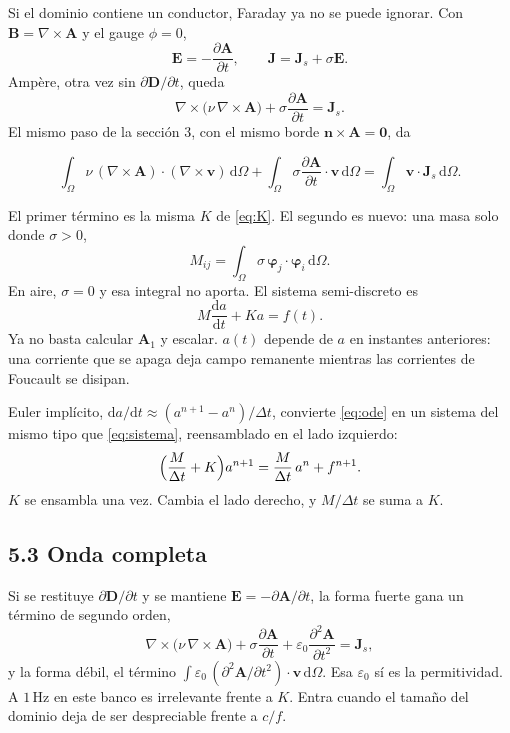 \documentclass[11pt]{article}
\newcommand{\curl}{\nabla\times}
\newcommand{\nv}{\nu}
\newcommand{\dV}{\,\mathrm{d}\Omega}
\newcommand{\eqbox}[2]{%
  \par\smallskip
  \noindent\colorbox{resultbg}{%
    \begin{minipage}{\dimexpr\linewidth-2\fboxsep\relax}
      \vspace{0.2em}
      \[ #1 \tag{#2} \]
      \vspace{-0.45em}
    \end{minipage}}%
  \par\smallskip
}
\begin{document}
Si el dominio contiene un conductor, Faraday ya no se puede ignorar. Con \(\mathbf{B}=\curl\mathbf{A}\) y el gauge \(\phi=0\),
\begin{equation}
\mathbf{E}=-\frac{\partial\mathbf{A}}{\partial t},
\qquad
\mathbf{J}=\mathbf{J}_{s}+\sigma\mathbf{E}.
\label{eq:E}
\end{equation}
Ampère, otra vez sin \(\partial\mathbf{D}/\partial t\), queda
\begin{equation}
\curl\bigl(\nv\,\curl\mathbf{A}\bigr)+\sigma\frac{\partial\mathbf{A}}{\partial t}=\mathbf{J}_{s}.
\label{eq:eddy-fuerte}
\end{equation}
El mismo paso de la sección 3, con el mismo borde \(\mathbf{n}\times\mathbf{A}=\mathbf{0}\), da
\eqbox{
\int_{\Omega}\nv\,(\curl\mathbf{A})\cdot(\curl\mathbf{v})\dV
+\int_{\Omega}\sigma\frac{\partial\mathbf{A}}{\partial t}\cdot\mathbf{v}\dV
=\int_{\Omega}\mathbf{v}\cdot\mathbf{J}_{s}\dV.
}{\(**\)}
El primer término es la misma \(K\) de \eqref{eq:K}. El segundo es nuevo: una masa solo donde \(\sigma>0\),
\begin{equation}
M_{ij}=\int_{\Omega}\sigma\,\boldsymbol{\varphi}_{j}\cdot\boldsymbol{\varphi}_{i}\dV.
\label{eq:M}
\end{equation}
En aire, \(\sigma=0\) y esa integral no aporta. El sistema semi-discreto es
\begin{equation}
M\frac{\mathrm{d}a}{\mathrm{d}t}+Ka=f(t).
\label{eq:ode}
\end{equation}
Ya no basta calcular \(\mathbf{A}_{1}\) y escalar. \(a(t)\) depende de \(a\) en instantes anteriores: una corriente que se apaga deja campo remanente mientras las corrientes de Foucault se disipan.

Euler implícito, \(\mathrm{d}a/\mathrm{d}t\approx(a^{n+1}-a^{n})/\Delta t\), convierte \eqref{eq:ode} en un sistema del mismo tipo que \eqref{eq:sistema}, reensamblado en el lado izquierdo:
\begin{equation}
\Bigl(\frac{M}{\Delta t}+K\Bigr)a^{n+1}
=\frac{M}{\Delta t}\,a^{n}+f^{n+1}.
\label{eq:euler}
\end{equation}
\(K\) se ensambla una vez. Cambia el lado derecho, y \(M/\Delta t\) se suma a \(K\).

\subsection*{5.3 Onda completa}

Si se restituye \(\partial\mathbf{D}/\partial t\) y se mantiene \(\mathbf{E}=-\partial\mathbf{A}/\partial t\), la forma fuerte gana un término de segundo orden,
\begin{equation}
\curl\bigl(\nv\,\curl\mathbf{A}\bigr)
+\sigma\frac{\partial\mathbf{A}}{\partial t}
+\varepsilon_{0}\frac{\partial^{2}\mathbf{A}}{\partial t^{2}}
=\mathbf{J}_{s},
\label{eq:onda}
\end{equation}
y la forma débil, el término
\(\int\varepsilon_{0}\,(\partial^{2}\mathbf{A}/\partial t^{2})\cdot\mathbf{v}\,\mathrm{d}\Omega\).
Esa \(\varepsilon_{0}\) sí es la permitividad. A \(1\,\mathrm{Hz}\) en este banco es irrelevante frente a \(K\). Entra cuando el tamaño del dominio deja de ser despreciable frente a \(c/f\).
\end{document}
